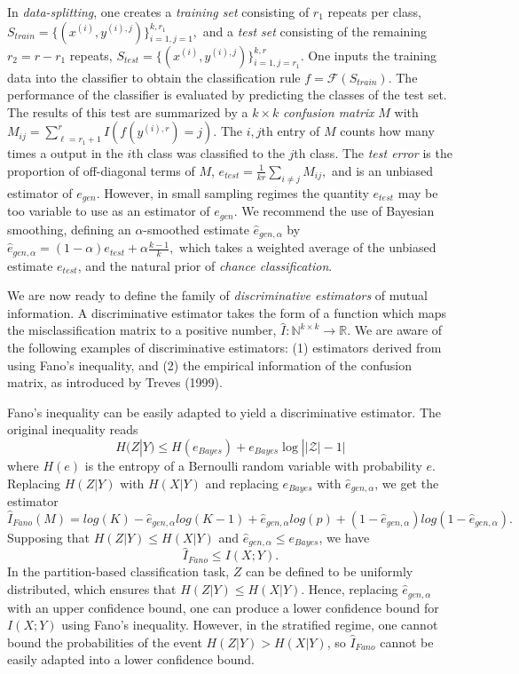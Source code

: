 \documentclass{article}
\begin{document}
In \emph{data-splitting}, one creates a \emph{training
set} consisting of $r_1$ repeats per class,
$
S_{train} = \{(x^{(i)}, y^{(i),j})\}_{i=1, j=1}^{k, r_1},
$
and a \emph{test set} consisting of the remaining $r_2 = r - r_1$ repeats,
$
S_{test} = \{(x^{(i)}, y^{(i),j})\}_{i=1, j=r_1}^{k, r}.
$
One inputs the training data into the classifier to obtain the classification rule
$
f = \mathcal{F}(S_{train}).
$
The performance of the classifier is evaluated by predicting the classes of the test set.
The results of this test are summarized by a $k \times k$ \emph{confusion matrix} $M$ with
$
M_{ij} = \sum_{\ell=r_1 + 1}^r I(f(y^{(i), r}) = j).
$
The $i, j$th entry of $M$ counts how many times a output in the $i$th class was classified  to the $j$th class.
The \emph{test error} is the proportion of off-diagonal terms of $M$,
$
e_{test} = \frac{1}{kr} \sum_{i \neq j} M_{ij},
$
and is an unbiased estimator of $e_{gen}$.
However, in small sampling regimes the quantity $e_{test}$ may be too variable to use as an estimator of $e_{gen}$.  We recommend the use of Bayesian smoothing, defining an  $\alpha$-smoothed estimate $\hat{e}_{gen, \alpha}$ by
$
\hat{e}_{gen, \alpha} = (1 - \alpha) e_{test} + \alpha \frac{k-1}{k},
$
which takes a weighted average of the unbiased estimate $e_{test}$, and the natural prior of \emph{chance classification}.

We are now ready to define the family of \emph{discriminative estimators} of mutual information.
A discriminative estimator takes the form of a function which maps the misclassification matrix to a positive number,
$
\hat{I}: \mathbb{N}^{k \times k} \to \mathbb{R}.
$
We are aware of the following examples of discriminative estimators: (1) estimators derived from using Fano's inequality, and (2) the empirical information of the confusion matrix, as introduced by Treves (1999).

Fano's inequality can be easily adapted to yield a discriminative estimator.
The original inequality reads
\[
H(Z|Y) \leq H(e_{Bayes}) + e_{Bayes} \log ||\mathcal{Z}| - 1|
\]
where $H(e)$ is the entropy of a Bernoulli random variable with probability $e$.
Replacing $H(Z|Y)$ with $H(X|Y)$ and replacing $e_{Bayes}$ with $\hat{e}_{gen, \alpha}$,
we get the estimator
\[
\hat{I}_{Fano}(M) = log(K) - \hat{e}_{gen, \alpha} log(K-1) + \hat{e}_{gen, \alpha} log(p) + (1-\hat{e}_{gen, \alpha}) log(1-\hat{e}_{gen, \alpha}).
\]
Supposing that $H(Z|Y) \leq H(X|Y)$ and $\hat{e}_{gen, \alpha} \leq e_{Bayes}$, we have
\[\hat{I}_{Fano} \leq I(X; Y).\]
In the partition-based classification task, $Z$ can be defined to be uniformly distributed, which ensures that  $H(Z|Y) \leq H(X|Y)$.  Hence, replacing $\hat{e}_{gen,\alpha}$ with an upper confidence bound, one can produce a lower confidence bound for $I(X; Y)$ using Fano's inequality.
However, in the stratified regime, one cannot bound the probabilities of the event $H(Z|Y) > H(X|Y)$,
so $\hat{I}_{Fano}$ cannot be easily adapted into a lower confidence bound.
\end{document}
